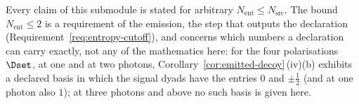 \begin{remark}
Every claim of this submodule is stated for arbitrary
$N_{\mathrm{ent}}\le N_{\mathrm{src}}$. The bound $N_{\mathrm{ent}}\le2$ is a
requirement of the emission, the step that outputs the declaration
(Requirement~\ref{req:entropy-cutoff}), and concerns which numbers a
declaration can carry exactly, not any of the mathematics here: for the four
polarisations $\Dset$, at one and at two photons,
Corollary~\ref{cor:emitted-decoy}\,(iv)(b) exhibits a declared basis in which
the signal dyads have the entries $0$ and $\pm\tfrac12$ (and at one photon
also $1$); at three photons and above no such basis is given here.
\end{remark}
